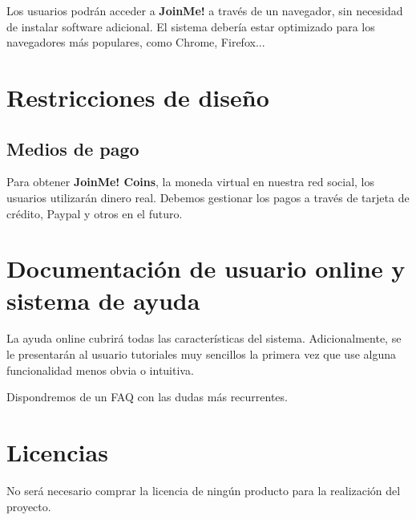 \documentclass[12pt, a4paper, titlepage]{article}
\begin{document}
Los usuarios podrán acceder a \textbf{JoinMe!} a través de un navegador, sin necesidad de instalar software adicional. El sistema debería estar optimizado para los navegadores más populares, como Chrome, Firefox...

\section{Restricciones de diseño}

\subsection{Medios de pago}

Para obtener \textbf{JoinMe! Coins}, la moneda virtual en nuestra red social, los usuarios utilizarán dinero real. Debemos gestionar los pagos a través de tarjeta de crédito, Paypal y otros en el futuro.

\section{Documentación de usuario online y sistema de ayuda}

La ayuda online cubrirá todas las características del sistema. Adicionalmente, se le presentarán al usuario tutoriales muy sencillos la primera vez que use alguna funcionalidad menos obvia o intuitiva.

Dispondremos de un FAQ con las dudas más recurrentes.


\section{Licencias}

No será necesario comprar la licencia de ningún producto para la realización del proyecto.

\end{document}
